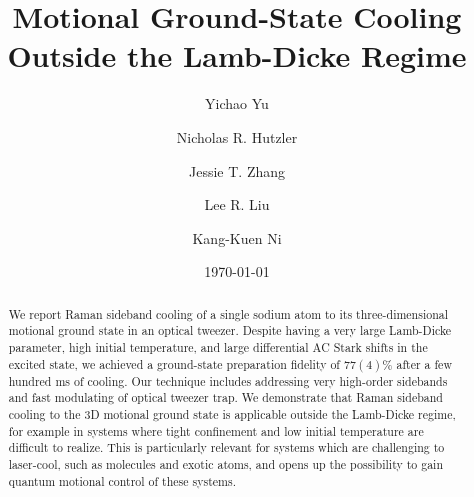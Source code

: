 \documentclass[aps,prl,twocolumn,groupedaddress]{revtex4-1}
\begin{document}
\title{Motional Ground-State Cooling Outside the Lamb-Dicke Regime}
\author{Yichao Yu}
\author{Nicholas R. Hutzler}
\author{Jessie T. Zhang}
\author{Lee R. Liu}
\author{Kang-Kuen Ni}

\date{\today}

\begin{abstract}
  We report Raman sideband cooling of a single sodium atom to its three-dimensional
  motional ground state in an optical tweezer.
  Despite having a very large Lamb-Dicke parameter, high initial temperature, and
  large differential AC Stark shifts in the excited state,
  we achieved a ground-state preparation fidelity of $77(4)\%$ after a few hundred ms of cooling.
  Our technique includes addressing very high-order sidebands and
  fast modulating of optical tweezer trap.
  We demonstrate that Raman sideband cooling to the 3D motional ground state is applicable
  outside the Lamb-Dicke regime, for example in
  systems where tight confinement and low initial temperature are difficult to realize.
  This is particularly relevant for systems which are challenging to laser-cool,
  such as molecules and exotic atoms,
  and opens up the possibility to gain quantum motional control of these systems.
\end{abstract}

\maketitle
\end{document}
